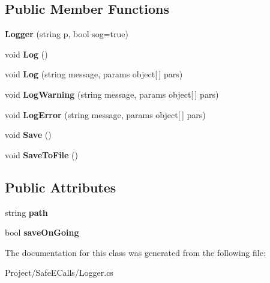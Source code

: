 \subsection*{Public Member Functions}
\begin{DoxyCompactItemize}
\item 
\mbox{\label{class_lerp2_a_p_i_1_1_safe_e_calls_1_1_logger_a98d4fb2ea03458b4a82ace76504e721f}} 
{\bfseries Logger} (string p, bool sog=true)
\item 
\mbox{\label{class_lerp2_a_p_i_1_1_safe_e_calls_1_1_logger_afc13847cd5053a6e6aa0d5c8f41ce9cc}} 
void {\bfseries Log} ()
\item 
\mbox{\label{class_lerp2_a_p_i_1_1_safe_e_calls_1_1_logger_a67a56223a076c17cdc2f54160b4fd1b8}} 
void {\bfseries Log} (string message, params object\mbox{[}$\,$\mbox{]} pars)
\item 
\mbox{\label{class_lerp2_a_p_i_1_1_safe_e_calls_1_1_logger_a2890fe877c2b2d9225d6f3dee0998ce6}} 
void {\bfseries Log\+Warning} (string message, params object\mbox{[}$\,$\mbox{]} pars)
\item 
\mbox{\label{class_lerp2_a_p_i_1_1_safe_e_calls_1_1_logger_a58926654a815d526808a9c204de3c1b0}} 
void {\bfseries Log\+Error} (string message, params object\mbox{[}$\,$\mbox{]} pars)
\item 
\mbox{\label{class_lerp2_a_p_i_1_1_safe_e_calls_1_1_logger_a12892563e5b82f18ba845b1140b19feb}} 
void {\bfseries Save} ()
\item 
\mbox{\label{class_lerp2_a_p_i_1_1_safe_e_calls_1_1_logger_a5bd6c557cfff65281e5e92ec62ef8516}} 
void {\bfseries Save\+To\+File} ()
\end{DoxyCompactItemize}
\subsection*{Public Attributes}
\begin{DoxyCompactItemize}
\item 
\mbox{\label{class_lerp2_a_p_i_1_1_safe_e_calls_1_1_logger_ae8ca75777c2e35101dc87905cb3afb56}} 
string {\bfseries path}
\item 
\mbox{\label{class_lerp2_a_p_i_1_1_safe_e_calls_1_1_logger_afe7d01ca1c989391d718005df4f61a5a}} 
bool {\bfseries save\+On\+Going}
\end{DoxyCompactItemize}


The documentation for this class was generated from the following file\+:\begin{DoxyCompactItemize}
\item 
Project/\+Safe\+E\+Calls/Logger.\+cs\end{DoxyCompactItemize}
